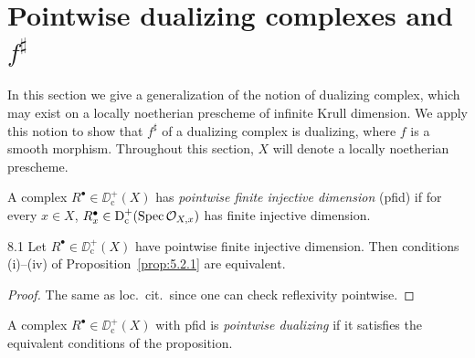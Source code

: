 \section{Pointwise dualizing complexes and $f^{\sharp}$}\label{sec:5.8}
\begingroup
\setlength{\emergencystretch}{2em}

In this section we give a generalization of the notion of dualizing complex, which may exist on a locally noetherian prescheme of infinite Krull dimension. We apply this notion to show that $f^{\sharp}$ of a dualizing complex is dualizing, where $f$ is a smooth morphism. Throughout this section, $X$ will denote a locally noetherian prescheme.

\begin{definition*}
A complex $R^\bullet\in\DD_{\mathrm{c}}^+(X)$ has \emph{pointwise finite injective dimension} (pfid) if for every $x\in X$, $R_x^\bullet\in\operatorname{D}_{\mathrm{c}}^+(\operatorname{Spec}\mathcal{O}_{X,x})$ has finite injective dimension.
\end{definition*}

\begin{bookproposition}{8.1}\label{prop:5.8.1}
Let $R^\bullet\in\DD_{\mathrm{c}}^+(X)$ have pointwise finite injective dimension. Then conditions (i)--(iv) of Proposition~\ref{prop:5.2.1} are equivalent.
\end{bookproposition}

\begin{proof}
The same as loc.\ cit.\ since one can check reflexivity pointwise.
\end{proof}

\begin{definition*}
A complex $R^\bullet\in\DD^+_{\mathrm{c}}(X)$ with pfid is \emph{pointwise dualizing} if it satisfies the equivalent conditions of the proposition.
\end{definition*}

